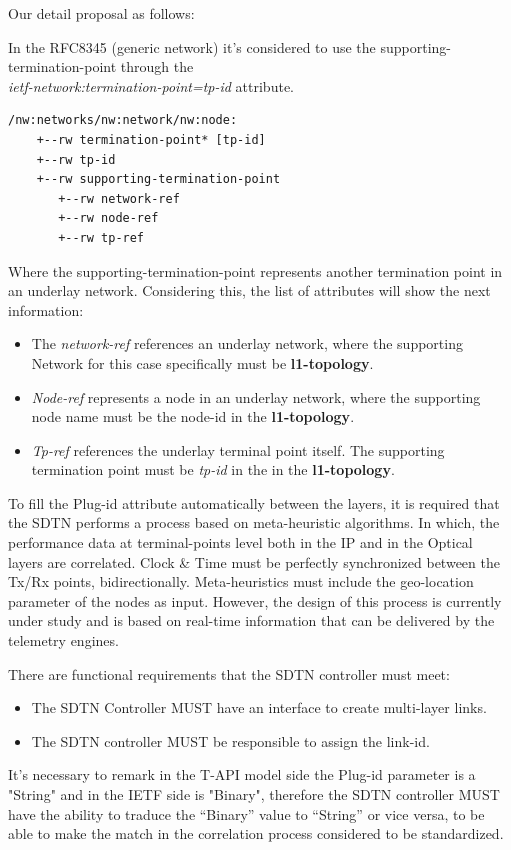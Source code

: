 \documentclass[a4paper,fleqn]{cas-dc}
\begin{document}
Our detail proposal as follows: 

In the RFC8345 (generic network) it’s considered to use the supporting-termination-point through the
\\ \textit{ietf-network:termination-point={tp-id}} attribute.

\begin{lstlisting}[basicstyle=\ttfamily\small,label=tps,caption=Supporting termination point Structure]
/nw:networks/nw:network/nw:node:
    +--rw termination-point* [tp-id]
    +--rw tp-id 
    +--rw supporting-termination-point
       +--rw network-ref
       +--rw node-ref
       +--rw tp-ref
\end{lstlisting}

Where the supporting-termination-point represents another termination point in an underlay network. Considering this, the list of attributes will show the next information: 
\begin{itemize}
    \item The \textit{network-ref} references an underlay network, where the supporting Network for this case specifically must be \textbf{l1-topology}.
    \item \textit{Node-ref} represents a node in an underlay network, where the supporting node name must be the node-id in the \textbf{l1-topology}.
    \item \textit{Tp-ref} references the underlay terminal point itself. The supporting termination point must be \textit{tp-id} in the in the \textbf{l1-topology}.
\end{itemize}

To fill the Plug-id attribute automatically between the layers, it is required that the SDTN performs a process based on meta-heuristic algorithms. In which, the performance data at terminal-points level both in the IP and in the Optical layers are correlated. Clock \& Time must be perfectly synchronized between the Tx/Rx points, bidirectionally. Meta-heuristics must include the geo-location parameter of the nodes as input. However, the design of this process is currently under study and is based on real-time information that can be delivered by the telemetry engines.

There are functional requirements that the SDTN controller must meet:
\begin{itemize}
    \item The SDTN Controller MUST have an interface to create multi-layer links.
    \item The SDTN controller MUST be responsible to assign the link-id.
\end{itemize}
It’s necessary to remark in the T-API model side the Plug-id parameter is a "String" and in the IETF side is "Binary", therefore the SDTN controller MUST have the ability to traduce the “Binary” value to “String” or vice versa, to be able to make the match in the correlation process considered to be standardized.
\end{document}
